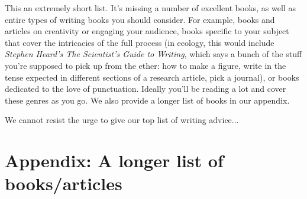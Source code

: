 \documentclass[11pt,letter]{article}
\begin{document}
This an extremely short list. It's missing a number of excellent books, as well as entire types of writing books you should consider. For example, books and articles on creativity or engaging your audience, books specific to your subject that cover the intricacies of the full process (in ecology, this would include \emph{Stephen Heard’s The Scientist’s Guide to Writing}, which says a bunch of the stuff you’re supposed to pick up from the ether: how to make a figure, write in the tense expected in different sections of a research article, pick a journal), or books dedicated to the love of punctuation. Ideally you'll be reading a lot and cover these genres as you go. We also provide a longer list of books in our appendix. 

We cannot resist the urge to give our top list of writing advice... %


\section{Appendix: A longer list of books/articles}
\end{document}
